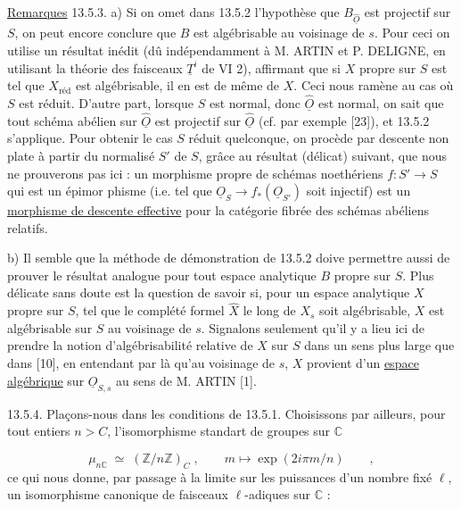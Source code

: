 \underline{Remarques} 13.5.3. a) Si on omet dans 13.5.2 l'hypothèse que $B_{\hat{\underline{O}}}$ est projectif sur $S$, on peut encore conclure que $B$ est algébrisable au voisinage de $s$. Pour ceci on utilise un résultat inédit (dû indépendamment à M. ARTIN et P. DELIGNE, en utilisant la théorie des faisceaux $\underline{T}^i$ de VI 2), affirmant que si $X$ propre sur $S$ est tel que $X_{\text{réd}}$ est algébrisable, il en est de même de $X$. Ceci nous ramène au cas où $S$ est réduit. D'autre part, lorsque $S$ est normal, donc $\hat{\underline{O}}$ est normal, on sait que tout schéma abélien sur $\hat{\underline{O}}$ est projectif sur $\hat{\underline{O}}$ (cf. par exemple [23]), et 13.5.2 s'applique. Pour obtenir le cas $S$ réduit quelconque, on procède par descente non plate à partir du normalisé $S'$ de $S$, grâce au résultat (délicat) suivant, que nous ne prouverons pas ici : un morphisme propre de schémas noethériens $f : S' \longrightarrow S$ qui est un épimor%
phisme (i.e. tel que $\underline{O}_S \longrightarrow f_*(\underline{O}_{S'})$ soit injectif) est un \underline{morphisme de descente effective} pour la catégorie fibrée des schémas abéliens relatifs.

b) Il semble que la méthode de démonstration de 13.5.2 doive permettre aussi de prouver le résultat analogue pour tout espace analytique $B$ propre sur $S$. Plus délicate sans doute est la question de savoir si, pour un espace analytique $X$ propre sur $S$, tel que le complété formel $\hat{X}$ le long de $X_s$ soit algébrisable, $X$ est algébrisable sur $S$ au voisinage de $s$. Signalons seulement qu'il y a lieu ici de prendre la notion d'algébrisabilité relative de $X$ sur $S$ dans un sens plus large que dans [10], en entendant par là qu'au voisinage de $s$, $X$ provient d'un \underline{espace algébrique} sur $\underline{O}_{S,s}$ au sens de M. ARTIN [1].

13.5.4. Plaçons-nous dans les conditions de 13.5.1. Choisissons par ailleurs, pour tout entiers $n > C$, l'isomorphisme standart de groupes sur $\mathbb{C}$

\begin{equation*}
\mu_{n\mathbb{C}} \;\simeq\; (\mathbb{Z}/n\mathbb{Z})_{C} \;,\qquad m \longmapsto \exp(2i\pi m/n) \qquad ,
\end{equation*}
ce qui nous donne, par passage à la limite sur les puissances d'un nombre fixé $\ell$, un isomorphisme canonique de faisceaux $\ell$-adiques sur $\mathbb{C}$ :

